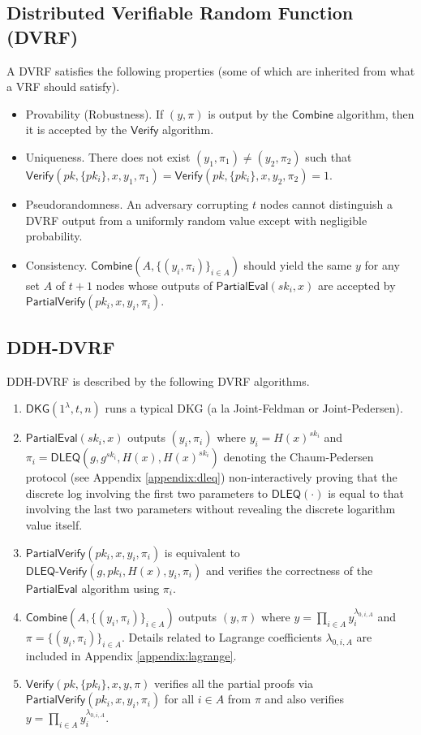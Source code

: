 \documentclass[letterpaper,twocolumn,10pt]{article}
\theoremstyle{definition}
\theoremstyle{remark}
\begin{document}
\subsection{Distributed Verifiable Random Function (DVRF)}
\label{appendix:dvrf}
A DVRF satisfies the following properties (some of which are inherited from what a VRF should satisfy).
\begin{itemize}
\item Provability (Robustness). If $(y, \pi)$ is output by the $\mathsf{Combine}$ algorithm, then it is accepted by the $\mathsf{Verify}$ algorithm.
\item Uniqueness. There does not exist $(y_1, \pi_1) \neq (y_2, \pi_2)$ such that $\mathsf{Verify}(pk, \{pk_i\}, x, y_1, \pi_1) = \mathsf{Verify}(pk, \{pk_i\}, x, y_2, \pi_2) = 1$.
\item Pseudorandomness. An adversary corrupting $t$ nodes cannot distinguish a DVRF output from a uniformly random value except with negligible probability.
\item Consistency. $\mathsf{Combine}(A, \{(y_i, \pi_i)\}_{i \in A})$ should yield the same $y$ for any set $A$ of $t + 1$ nodes whose outputs of $\mathsf{PartialEval}(sk_i, x)$ are accepted by $\mathsf{PartialVerify}(pk_i, x, y_i, \pi_i)$.
\end{itemize}

\subsection{DDH-DVRF}
\label{appendix:ddh-dvrf}
DDH-DVRF is described by the following DVRF algorithms.
\begin{enumerate}
\item $\mathsf{DKG}(1^\lambda, t, n)$ runs a typical DKG (a la Joint-Feldman or Joint-Pedersen).
\item $\mathsf{PartialEval}(sk_i, x)$ outputs $(y_i, \pi_i)$ where $y_i = H(x)^{sk_i}$ and $\pi_i = \mathsf{DLEQ}(g, g^{sk_i}, H(x), H(x)^{sk_i})$ denoting the Chaum-Pedersen protocol (see Appendix \ref{appendix:dleq}) non-interactively proving that the discrete log involving the first two parameters to $\mathsf{DLEQ}(\cdot)$ is equal to that involving the last two parameters without revealing the discrete logarithm value itself.
\item $\mathsf{PartialVerify}(pk_i, x, y_i, \pi_i)$ is equivalent to $\mathsf{DLEQ}\text{-}\mathsf{Verify}(g, pk_i, H(x), y_i, \pi_i)$ and verifies the correctness of the $\mathsf{PartialEval}$ algorithm using $\pi_i$.
\item $\mathsf{Combine}(A, \{(y_i, \pi_i)\}_{i \in A})$ outputs $(y, \pi)$ where $y = \prod_{i \in A} y_i^{\lambda_{0, i, A}}$ and $\pi = \{(y_i, \pi_i)\}_{i \in A}$. Details related to Lagrange coefficients $\lambda_{0, i, A}$ are included in Appendix \ref{appendix:lagrange}.
\item $\mathsf{Verify}(pk, \{pk_i\}, x, y, \pi)$ verifies all the partial proofs via $\mathsf{PartialVerify}(pk_i, x, y_i, \pi_i)$ for all $i \in A$ from $\pi$ and also verifies $y = \prod_{i \in A} y_i^{\lambda_{0, i, A}}$.
\end{enumerate}
\end{document}
